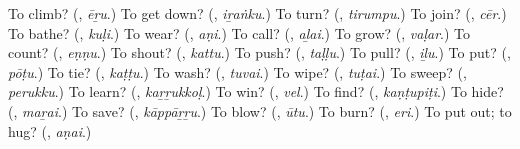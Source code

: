 \begin{tcolorbox}[breakable,colback=teal!4,colframe=teal!35!black,title={Before you move on}]
To climb? (\textbf{}, \emph{ēṟu}.) To get down? (\textbf{}, \emph{iṟaṅku}.) To turn? (\textbf{}, \emph{tirumpu}.) To join? (\textbf{}, \emph{cēr}.) To bathe? (\textbf{}, \emph{kuḷi}.) To wear? (\textbf{}, \emph{aṇi}.) To call? (\textbf{}, \emph{aḻai}.) To grow? (\textbf{}, \emph{vaḷar}.) To count? (\textbf{}, \emph{eṇṇu}.) To shout? (\textbf{}, \emph{kattu}.) To push? (\textbf{}, \emph{taḷḷu}.) To pull? (\textbf{}, \emph{iḻu}.) To put? (\textbf{}, \emph{pōṭu}.) To tie? (\textbf{}, \emph{kaṭṭu}.) To wash? (\textbf{}, \emph{tuvai}.) To wipe? (\textbf{}, \emph{tuṭai}.) To sweep? (\textbf{}, \emph{perukku}.) To learn? (\textbf{}, \emph{kaṟṟukkoḷ}.) To win? (\textbf{}, \emph{vel}.) To find? (\textbf{}, \emph{kaṇṭupiṭi}.) To hide? (\textbf{}, \emph{maṟai}.) To save? (\textbf{}, \emph{kāppāṟṟu}.) To blow? (\textbf{}, \emph{ūtu}.) To burn? (\textbf{}, \emph{eri}.) To put out; to hug? (\textbf{}, \emph{aṇai}.)
\end{tcolorbox}
